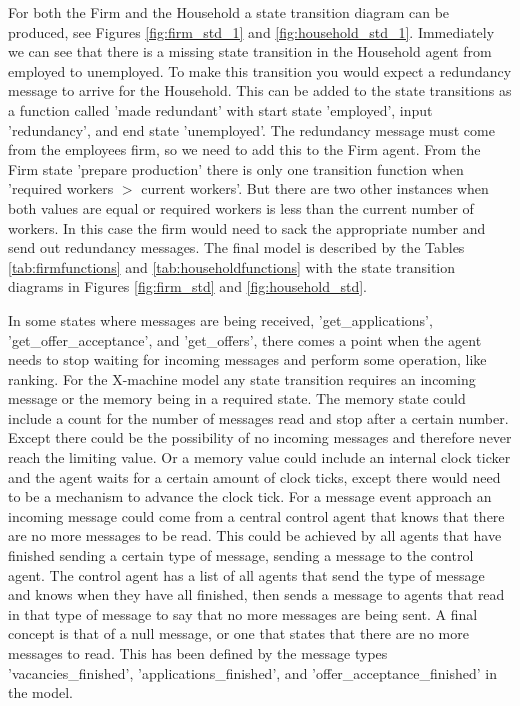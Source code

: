 \documentclass[a4paper,11pt]{article}
\begin{document}
For both the Firm and the Household a state transition diagram can be produced, see Figures \ref{fig:firm_std_1} and \ref{fig:household_std_1}. Immediately we can see that there is a missing state transition in the Household agent from employed to unemployed. To make this transition you would expect a redundancy message to arrive for the Household. This can be added to the state transitions as a function called 'made redundant' with start state 'employed', input 'redundancy', and end state 'unemployed'. The redundancy message must come from the employees firm, so we need to add this to the Firm agent. From the Firm state 'prepare production' there is only one transition function when 'required workers $>$ current workers'. But there are two other instances when both values are equal or required workers is less than the current number of workers. In this case the firm would need to sack the appropriate number and send out redundancy messages. The final model is described by the Tables \ref{tab:firmfunctions} and \ref{tab:householdfunctions} with the state transition diagrams in Figures \ref{fig:firm_std} and \ref{fig:household_std}.

In some states where messages are being received, 'get\_applications', 'get\_offer\_acceptance', and 'get\_offers', there comes a point when the agent needs to stop waiting for incoming messages and perform some operation, like ranking. For the X-machine model any state transition requires an incoming message or the memory being in a required state. The memory state could include a count for the number of messages read and stop after a certain number. Except there could be the possibility of no incoming messages and therefore never reach the limiting value. Or a memory value could include an internal clock ticker and the agent waits for a certain amount of clock ticks, except there would need to be a mechanism to advance the clock tick. For a message event approach an incoming message could come from a central control agent that knows that there are no more messages to be read. This could be achieved by all agents that have finished sending a certain type of message, sending a message to the control agent. The control agent has a list of all agents that send the type of message and knows when they have all finished, then sends a message to agents that read in that type of message to say that no more messages are being sent. A final concept is that of a null message, or one that states that there are no more messages to read. This has been defined by the message types 'vacancies\_finished', 'applications\_finished', and 'offer\_acceptance\_finished' in the model.
\end{document}
